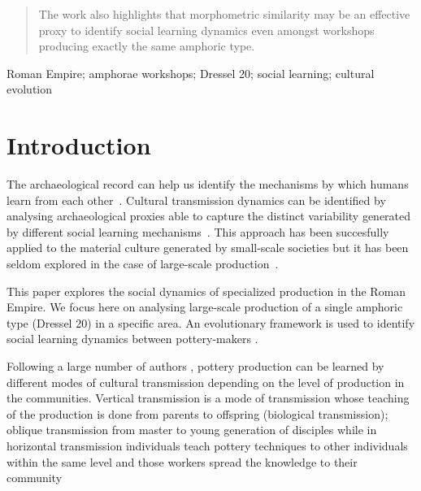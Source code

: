 \documentclass[review]{elsarticle}
\begin{document}
\begin{frontmatter}
\begin{abstract}
The work also highlights that morphometric similarity may be an effective proxy to identify social learning dynamics even amongst workshops producing exactly the same amphoric type. 

\end{abstract}

\begin{keyword}
Roman Empire; amphorae workshops; Dressel 20; social learning; cultural evolution
\end{keyword}

\end{frontmatter}

\linenumbers

\section{Introduction}

The archaeological record can help us identify the mechanisms by which humans learn from each other~\citep{richerson2005not,schillinger_copying_2016}. Cultural transmission dynamics can be identified by analysing archaeological proxies able to capture the distinct variability generated by different social learning mechanisms~\citep{shennan_ceramic_2001,eerkens_jelmer_cultural_2005}. This approach has been succesfully applied to the material culture generated by small-scale societies but it has been seldom explored in the case of large-scale production~\citep{shennan_isolation-by-distance_2015}.

This paper explores the social dynamics of specialized production in the Roman Empire. We focus here on analysing large-scale production of a single amphoric type (Dressel 20) in a specific area. An evolutionary framework is used to identify social learning dynamics between pottery-makers \citep{shennan_evolution_2008,mesoudi_cultural_2015}. 

Following a large number of authors \citep{neff1992ceramics,shennan_genes_2002,bowser_learning_2008,hosfield_modes_2009}, pottery production can be learned by different modes of cultural transmission depending on the level of production in the communities. Vertical transmission is a mode of transmission whose teaching of the production is done from parents to offspring (biological transmission); oblique transmission from master to young generation of disciples while in horizontal transmission individuals teach pottery techniques to other individuals within the same level and those workers spread the knowledge to their community \citep{cavalli-sforza_cultural_1981, acerbi_cultural_2006}
\end{document}

